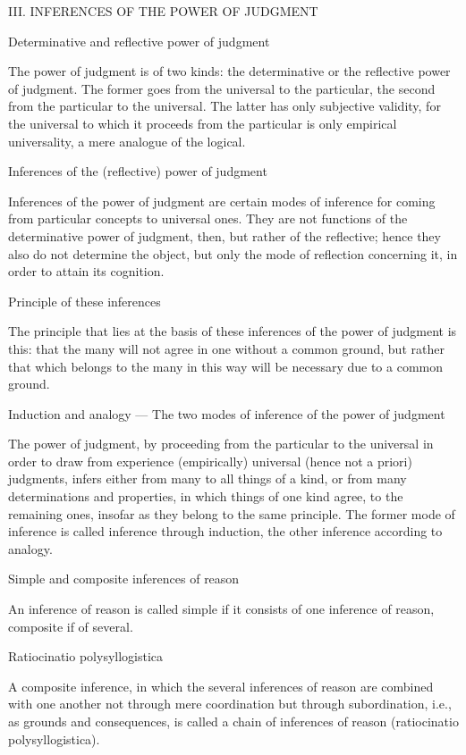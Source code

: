 III. INFERENCES OF THE POWER OF JUDGMENT

Determinative and reflective power of judgment

The power of judgment is of two kinds:
the determinative or the reflective power of judgment.
The former goes from the universal to the particular,
the second from the particular to the universal.
The latter has only subjective validity,
for the universal to which it proceeds from the particular
is only empirical universality, a mere analogue of the logical.

Inferences of the (reflective) power of judgment

Inferences of the power of judgment are
certain modes of inference for coming
from particular concepts to universal ones.
They are not functions of the determinative power of judgment, then,
but rather of the reflective;
hence they also do not determine the object,
but only the mode of reflection concerning it,
in order to attain its cognition.

Principle of these inferences

The principle that lies at the basis of
these inferences of the power of judgment is this:
that the many will not agree in one without a common ground,
but rather that which belongs to the many in this way will be
necessary due to a common ground.

Induction and analogy — The two modes of inference of the power of judgment

The power of judgment, by proceeding
from the particular to the universal
in order to draw from experience (empirically)
universal (hence not a priori) judgments,
infers either from many to all things of a kind,
or from many determinations and properties,
in which things of one kind agree,
to the remaining ones,
insofar as they belong to the same principle.
The former mode of inference is called inference through induction,
the other inference according to analogy.

Simple and composite inferences of reason

An inference of reason is called simple
if it consists of one inference of reason,
composite if of several.

Ratiocinatio polysyllogistica

A composite inference, in which
the several inferences of reason
are combined with one another
not through mere coordination
but through subordination,
i.e., as grounds and consequences,
is called a chain of inferences of reason
(ratiocinatio polysyllogistica).

